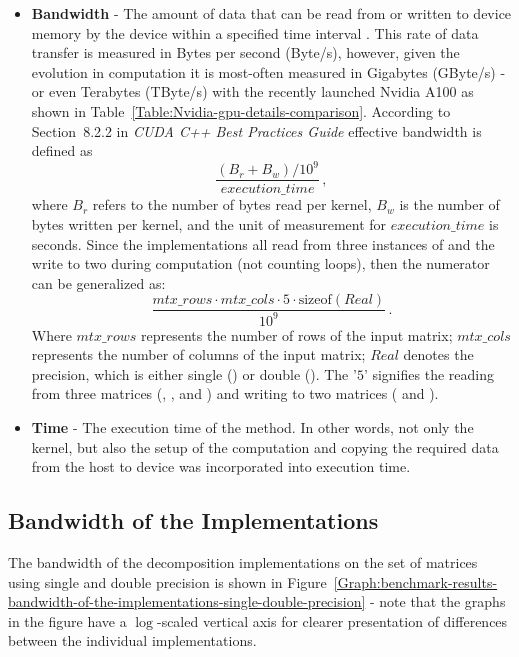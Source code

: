 \begin{itemize}
	\item \textbf{Bandwidth} - The amount of data that can be read from or written to device memory by the device within a specified time interval \cite{F4RUu4doMdeEMKXX}. This rate of data transfer is measured in Bytes per second (Byte/s), however, given the evolution in computation it is most-often measured in Gigabytes (GByte/s) - or even Terabytes (TByte/s) with the recently launched Nvidia A100 as shown in Table~\ref{Table:Nvidia-gpu-details-comparison}. According to Section~8.2.2 in \emph{CUDA C++ Best Practices Guide} \cite{F4RUu4doMdeEMKXX} effective bandwidth is defined as
		\begin{equation}
			\frac{\left(B_r + B_w\right)/10^9}{execution\_time} \nonumber\,,
		\end{equation}
	where $ B_r $ refers to the number of bytes read per kernel, $ B_w $ is the number of bytes written per kernel, and the unit of measurement for $ execution\_time $ is seconds. Since the implementations all read from three instances of  and the write to two during computation (not counting loops), then the numerator can be generalized as:
		\begin{equation}
			\frac{mtx\_rows \cdot mtx\_cols \cdot 5 \cdot \mathrm{sizeof} \left(Real\right)}{10^9} \nonumber\,.
		\end{equation}
	Where $ mtx\_rows $ represents the number of rows of the input matrix; $ mtx\_cols $ represents the number of columns of the input matrix; $ Real $ denotes the precision, which is either single () or double (). The '$ 5 $' signifies the reading from three matrices (, , and ) and writing to two matrices ( and ).
	\item \textbf{Time} - The execution time of the  method. In other words, not only the kernel, but also the setup of the computation and copying the required data from the host to device was incorporated into execution time.
\end{itemize}

\subsection{Bandwidth of the Implementations \TO}\label{Subsection:benchmark-results-bandwidth-of-the-implementations}
The bandwidth of the decomposition implementations on the set of matrices using single and double precision is shown in Figure~\ref{Graph:benchmark-results-bandwidth-of-the-implementations-single-double-precision} - note that the graphs in the figure have a $ \log $-scaled vertical axis for clearer presentation of differences between the individual implementations.

